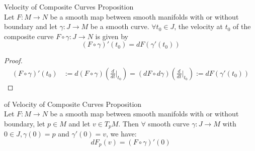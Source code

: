 \begin{proposition}{Velocity of Composite Curves Proposition}\\
Let $F:M\to N$ be a smooth map between smooth manifolds with or without boundary and let $\gamma: J\to M$ be a smooth curve. $\forall t_0\in J$, the velocity at $t_0$ of the composite curve $F\circ \gamma: J\to N$ is given by
\[
(F\circ \gamma)'(t_0)= dF(\gamma'(t_0))
\]
\end{proposition}

\begin{proof}
    \begin{align*}
        (F\circ \gamma)'(t_0)&:= d(F\circ \gamma) (\frac{d}{dt}|_{t_0})= (dF\circ d\gamma) (\frac{d}{dt}|_{t_0}) := dF(\gamma'(t_0))
    \end{align*}
\end{proof}

\begin{corollary}{of Velocity of Composite Curves Proposition}\\
Let $F:M\to N$ be a smooth map between smooth manifolds with or without boundary, let $p\in M$ and let $v\in T_pM$. Then $\forall$ smooth curve $\gamma:J\to M$ with $0\in J, \gamma(0) =p$ and $\gamma'(0)=v$, we have:
\[
dF_p(v)= (F\circ \gamma)'(0)
\]
\end{corollary}